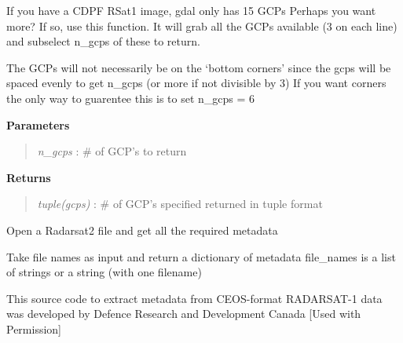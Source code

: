 \documentclass[letterpaper,10pt,english]{sphinxmanual}
\begin{document}
\begin{fulllineitems}
\begin{fulllineitems}
\end{fulllineitems}


\begin{fulllineitems}
\label{code:Metadata.Metadata.getMoreGCPs}
If you have a CDPF RSat1 image, gdal only has 15 GCPs
Perhaps you want more?  If so, use this function.
It will grab all the GCPs available (3 on each line) and
subselect n\_gcps of these to return.

The GCPs will not necessarily be on the `bottom corners' since the gcps
will be spaced evenly to get n\_gcps (or more if not divisible by 3)
If you want corners the only way to guarentee this is to set n\_gcps = 6

\textbf{Parameters}
\begin{quote}

\emph{n\_gcps}      : \# of GCP's to return
\end{quote}

\textbf{Returns}
\begin{quote}

\emph{tuple(gcps)} : \# of GCP's specified returned in tuple format
\end{quote}

\end{fulllineitems}


\begin{fulllineitems}
\label{code:Metadata.Metadata.getRS2metadata}
Open a Radarsat2 file and get all the required metadata

\end{fulllineitems}


\begin{fulllineitems}
\label{code:Metadata.Metadata.get_ceos_metadata}
Take file names as input and return a dictionary of metadata
file\_names is a list of strings or a string (with one filename)

This source code to extract metadata from CEOS-format RADARSAT-1 
data was developed by Defence Research and Development Canada
{[}Used with Permission{]}


\end{fulllineitems}
\end{fulllineitems}
\end{document}
